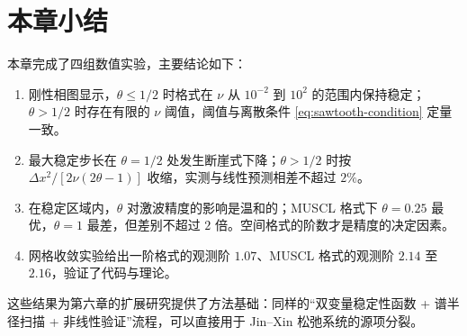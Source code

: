 \section{本章小结}

本章完成了四组数值实验，主要结论如下：
\begin{enumerate}[label=(\arabic*),leftmargin=2.4em]
  \item 刚性相图显示，$\theta\le1/2$ 时格式在 $\nu$ 从 $10^{-2}$ 到 $10^{2}$ 的范围内保持稳定；$\theta>1/2$ 时存在有限的 $\nu$ 阈值，阈值与离散条件 \eqref{eq:sawtooth-condition} 定量一致。
  \item 最大稳定步长在 $\theta=1/2$ 处发生断崖式下降；$\theta>1/2$ 时按 $\Delta x^2/[2\nu(2\theta-1)]$ 收缩，实测与线性预测相差不超过 $2\%$。
  \item 在稳定区域内，$\theta$ 对激波精度的影响是温和的；MUSCL 格式下 $\theta=0.25$ 最优，$\theta=1$ 最差，但差别不超过 $2$ 倍。空间格式的阶数才是精度的决定因素。
  \item 网格收敛实验给出一阶格式的观测阶 $1.07$、MUSCL 格式的观测阶 $2.14$ 至 $2.16$，验证了代码与理论。
\end{enumerate}
这些结果为第六章的扩展研究提供了方法基础：同样的“双变量稳定性函数 + 谱半径扫描 + 非线性验证”流程，可以直接用于 Jin--Xin 松弛系统的源项分裂。
